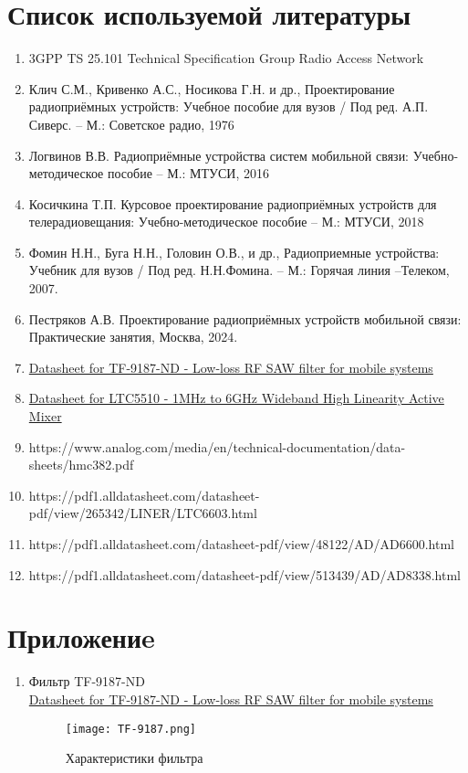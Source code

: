\documentclass[a4paper,12pt]{article}
\begin{document}
\section{Список используемой литературы}
\begin{enumerate}

\item 	3GPP TS 25.101 Technical Specification Group Radio Access Network
\item  Клич С.М., Кривенко А.С., Носикова Г.Н. и др., Проектирование радиоприёмных устройств: Учебное пособие для вузов / Под ред. А.П. Сиверс. –  М.: Советское радио, 1976 
\item  Логвинов В.В. Радиоприёмные устройства систем мобильной связи: Учебно-методическое пособие – М.: МТУСИ, 2016
\item  Косичкина Т.П. Курсовое проектирование радиоприёмных устройств для телерадиовещания: Учебно-методическое пособие – М.: МТУСИ, 2018
\item  Фомин Н.Н., Буга Н.Н., Головин О.В., и др., Радиоприемные устройства: Учебник для вузов / Под ред. Н.Н.Фомина. – М.: Горячая линия –Телеком, 2007.
\item  Пестряков А.В. Проектирование радиоприёмных устройств мобильной связи: Практические занятия, Москва, 2024.

\item  \href{URLhttps://www.transko.com/Word/RF%20SAW%20Filter/TF-9187-ND.pdf}{Datasheet for TF-9187-ND - Low-loss RF SAW filter for mobile systems}
\item  \href{https://www.analog.com/media/en/technical-documentation/data-sheets/5510fa.pdf}{Datasheet for LTC5510 - 1MHz to 6GHz Wideband High Linearity Active Mixer}
\item  https://www.analog.com/media/en/technical-documentation/data-sheets/hmc382.pdf
\item  https://pdf1.alldatasheet.com/datasheet-pdf/view/265342/LINER/LTC6603.html
\item  https://pdf1.alldatasheet.com/datasheet-pdf/view/48122/AD/AD6600.html
\item  https://pdf1.alldatasheet.com/datasheet-pdf/view/513439/AD/AD8338.html
\end{enumerate}

 \newpage

\section{Приложениe}
\begin{enumerate}
\item Фильтр TF-9187-ND \\
\href{URLhttps://www.transko.com/Word/RF%20SAW%20Filter/TF-9187-ND.pdf}{Datasheet for TF-9187-ND - Low-loss RF SAW filter for mobile systems}
\begin{figure}[H]
    \centering
    \texttt{[image: TF-9187.png]}
    \caption{Характеристики фильтра}
    \label{fig:enter-label}
\end{figure}
\end{enumerate}
\end{document}
